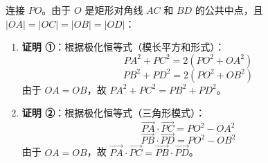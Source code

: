 \begin{proofbox}
连接 $PO$。由于 $O$ 是矩形对角线 $AC$ 和 $BD$ 的公共中点，且 $|OA|=|OC|=|OB|=|OD|$：
\begin{enumerate}
    \item \textbf{证明 ①}：根据极化恒等式（模长平方和形式）：
    \[ PA^2 + PC^2 = 2(PO^2 + OA^2) \]
    \[ PB^2 + PD^2 = 2(PO^2 + OB^2) \]
    由于 $OA = OB$，故 $PA^2 + PC^2 = PB^2 + PD^2$。
    \item \textbf{证明 ②}：根据极化恒等式（三角形模式）：
    \[ \vec{PA} \cdot \vec{PC} = PO^2 - OA^2 \]
    \[ \vec{PB} \cdot \vec{PD} = PO^2 - OB^2 \]
    由于 $OA = OB$，故 $\vec{PA} \cdot \vec{PC} = \vec{PB} \cdot \vec{PD}$。
\end{enumerate}
\end{proofbox}
